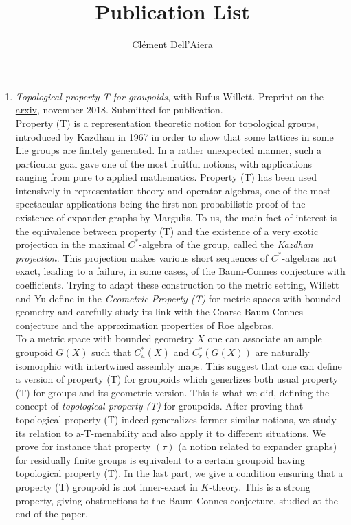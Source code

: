 \documentclass[a4paper]{article}
\title{Publication List}
\date{}
\author{ Clément Dell'Aiera}
\begin{document}
\maketitle

\begin{enumerate}
\item \textit{Topological property T for groupoids}, with Rufus Willett. Preprint on the \href{https://arxiv.org/abs/1811.07085}{arxiv}, november 2018. Submitted for publication.\\

Property (T) is a representation theoretic notion for topological groups, introduced by Kazdhan \cite{kazhdan1967connection} in 1967 in order to show that some lattices in some Lie groups are finitely generated. In a rather unexpected manner, such a particular goal gave one of the most fruitful notions, with applications ranging from pure to applied mathematics. Property (T) has been used intensively in representation theory and operator algebras, one of the most spectacular applications being the first non probabilistic proof of the existence of expander graphs by Margulis. To us, the main fact of interest is the equivalence between property (T) and the existence of a  very exotic projection in the maximal $C^*$-algebra of the group, called the \textit{Kazdhan projection}. This projection makes various short sequences of $C^*$-algebras not exact, leading to a failure, in some cases, of the Baum-Connes conjecture with coefficients. Trying to adapt these construction to the metric setting, Willett and Yu define in \cite{WillettYu} the \textit{Geometric Property (T)} for metric spaces with bounded geometry and carefully study its link with the Coarse Baum-Connes conjecture and the approximation properties of Roe algebras.\\

To a metric space with bounded geometry $X$ one can associate an ample groupoid $G(X)$ such that  $C^*_u(X)$ and $C_r^*(G(X))$ are naturally isomorphic with intertwined assembly maps. This suggest that one can define a version of property (T) for groupoids which generlizes both usual property (T) for groups and its geometric version. This is what we did, defining the concept of \textit{topological property (T)} for groupoids. After proving that topological property (T) indeed generalizes former similar notions, we study its relation to a-T-menability and also apply it to different situations. We prove for instance that property $(\tau)$ (a notion related to expander graphs) for residually finite groups is equivalent to a certain groupoid having topological property (T). In the last part, we give a condition ensuring that a property (T) groupoid is not inner-exact in $K$-theory. This is a strong property, giving obstructions to the Baum-Connes conjecture, studied at the end of the paper.


\end{enumerate}
\end{document}
